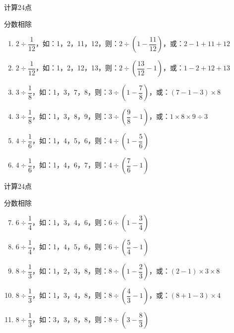 \documentclass[aspectratio=169]{ctexbeamer} %
\begin{document}
\begin{frame}[t]{计算24点}
\begin{spacing}{2.0}
\normalsize
\alert{分数相除}
\begin{enumerate}[label={\arabic*.}]
\item $2 \div \dfrac{1}{12}$，如：1，2，11，12，则：$2 \div (1- \dfrac{11}{12})$，或：$2 - 1 + 11 + 12$
\item $2 \div \dfrac{1}{12}$，如：1，2，12，13，则：$2 \div (\dfrac{13}{12} - 1)$，或：$1 - 2 + 12 + 13$
\item $3 \div \dfrac{1}{8}$，如：1，3，7，8，则：$3 \div (1 - \dfrac{7}{8})$，或：$(7 - 1 - 3) \times 8$
\item $3 \div \dfrac{1}{8}$，如：1，3，8，9，则：$3 \div (\dfrac{9}{8} - 1)$，或：$1 \times 8 \times 9 \div 3$
\item $4 \div \dfrac{1}{6}$，如：1，4，5，6，则：$4 \div (1 - \dfrac{5}{6})$
\item $4 \div \dfrac{1}{6}$，如：1，4，6，7，则：$4 \div (\dfrac{7}{6} - 1)$
\end{enumerate}
\end{spacing}
\end{frame}

\begin{frame}[t]{计算24点}
\begin{spacing}{2.0}
\normalsize
\alert{分数相除}
\begin{enumerate}[label={\arabic*.}]
\setcounter{enumi}{6}
\item $6 \div \dfrac{1}{4}$，如：1，3，4，6，则：$6 \div (1- \dfrac{3}{4})$
\item $6 \div \dfrac{1}{4}$，如：1，4，5，6，则：$6 \div (\dfrac{5}{4} - 1)$
\item $8 \div \dfrac{1}{3}$，如：1，2，3，8，则：$8 \div (1 - \dfrac{2}{3})$，或：$(2 - 1) \times 3 \times 8$
\item $8 \div \dfrac{1}{3}$，如：1，3，4，8，则：$8 \div (\dfrac{4}{3} - 1)$，或：$(8 + 1 - 3) \times 4$
\item $8 \div \dfrac{1}{3}$，如：3，3，8，8，则：$8 \div (3 - \dfrac{8}{3})$
\end{enumerate}
\end{spacing}
\end{frame}
\end{document}
